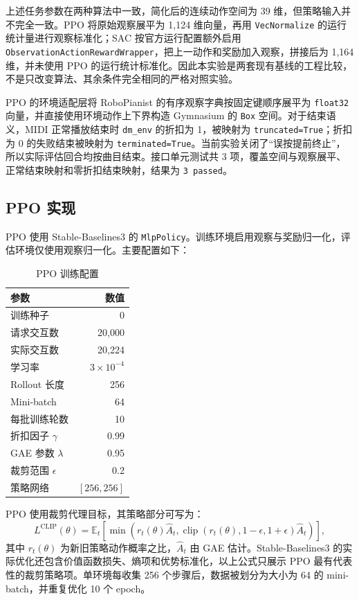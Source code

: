 \documentclass[UTF8,a4paper,11pt]{ctexart}
\begin{document}
上述任务参数在两种算法中一致，简化后的连续动作空间为 39 维，但策略输入并不完全一致。PPO 将原始观察展平为 1,124 维向量，再用 \texttt{VecNormalize} 的运行统计量进行观察标准化；SAC 按官方运行配置额外启用 \texttt{ObservationActionRewardWrapper}，把上一动作和奖励加入观察，拼接后为 1,164 维，并未使用 PPO 的运行统计标准化。因此本实验是两套现有基线的工程比较，不是只改变算法、其余条件完全相同的严格对照实验。

PPO 的环境适配层将 RoboPianist 的有序观察字典按固定键顺序展平为 \texttt{float32} 向量，并直接使用环境动作上下界构造 Gymnasium 的 \texttt{Box} 空间。对于结束语义，MIDI 正常播放结束时 \texttt{dm\_env} 的折扣为 1，被映射为 \texttt{truncated=True}；折扣为 0 的失败结束被映射为 \texttt{terminated=True}。当前实验关闭了“误按提前终止”，所以实际评估回合均按曲目结束。接口单元测试共 3 项，覆盖空间与观察展平、正常结束映射和零折扣结束映射，结果为 \texttt{3 passed}。

\subsection{PPO 实现}

PPO 使用 Stable-Baselines3 的 \texttt{MlpPolicy}。训练环境启用观察与奖励归一化，评估环境仅使用观察归一化。主要配置如下：
\begin{table}[H]
\centering
\caption{PPO 训练配置}
\begin{tabular}{lr}
\toprule
参数 & 数值 \\
\midrule
训练种子 & 0 \\
请求交互数 & 20,000 \\
实际交互数 & 20,224 \\
学习率 & $3\times10^{-4}$ \\
Rollout 长度 & 256 \\
Mini-batch & 64 \\
每批训练轮数 & 10 \\
折扣因子 $\gamma$ & 0.99 \\
GAE 参数 $\lambda$ & 0.95 \\
裁剪范围 $\epsilon$ & 0.2 \\
策略网络 & $[256,256]$ \\
\bottomrule
\end{tabular}
\end{table}

PPO 使用裁剪代理目标，其策略部分可写为：
\begin{equation}
L^{\mathrm{CLIP}}(\theta)=
\mathbb{E}_t\left[
\min\left(
r_t(\theta)\hat A_t,
\operatorname{clip}(r_t(\theta),1-\epsilon,1+\epsilon)\hat A_t
\right)
\right],
\end{equation}
其中 $r_t(\theta)$ 为新旧策略动作概率之比，$\hat A_t$ 由 GAE 估计。Stable-Baselines3 的实际优化还包含价值函数损失、熵项和优势标准化，以上公式只展示 PPO 最有代表性的裁剪策略项。单环境每收集 256 个步骤后，数据被划分为大小为 64 的 mini-batch，并重复优化 10 个 epoch。
\end{document}
